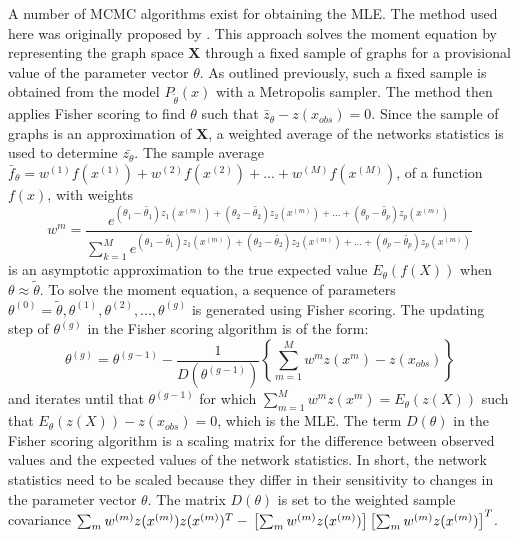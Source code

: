 \documentclass[a4paper, man]{apa6}
\begin{document}
A number of MCMC algorithms exist for obtaining the MLE. The method used here was originally proposed by . \clearpage \noindent This approach solves the moment equation by representing the graph space $\textbf{X}$ through a fixed sample of graphs for a provisional value of the parameter vector $\theta$. As outlined previously, such a fixed sample is obtained from the model $P_{\tilde{\theta}}(x)$ with a Metropolis sampler. The method then applies Fisher scoring to find $\theta$ such that $\bar{z}_\theta − z(x_{obs}) = 0$. Since the sample of graphs is an approximation of $\textbf{X}$, a weighted average of the networks statistics is used to determine $\bar{z_{\theta}}$. The sample average $\bar{f}_{\theta} = w^{(1)}f(x^{(1)}) + w^{(2)}f(x^{(2)}) + ... + w^{(M)}f(x^{(M)})$, of a function $f(x)$, with weights \begin{equation} w^{m} = \frac{e^{(\theta_{1} - \tilde{\theta_{1}})z_{1}(x^{(m)}) + (\theta_{2} - \tilde{\theta_{2}})z_{2}(x^{(m)}) + ... + (\theta_{p} - \tilde{\theta_{p}})z_{p}(x^{(m)})}}{\sum_{k=1}^{M}e^{(\theta_{1} - \tilde{\theta_{1}})z_{1}(x^{(m)}) + (\theta_{2} - \tilde{\theta_{2}})z_{2}(x^{(m)}) + ... + (\theta_{p} - \tilde{\theta_{p}})z_{p}(x^{(m)})}} \end{equation} is an asymptotic approximation to the true expected value $E_{\theta}(f(X))$ when $\theta \approx \tilde{\theta}$. To solve the moment equation, a sequence of parameters $\theta^{(0)} = \tilde{\theta}, \theta^{(1)}, \theta^{(2)}, ..., \theta^{(g)}$ is generated using Fisher scoring. The updating step of $\theta^{(g)}$ in the Fisher scoring algorithm is of the form: \begin{equation} \theta^{(g)} = \theta^{(g-1)} - \frac{1}{D(\theta^{(g-1)})} \left\{\sum_{m=1}^{M}w^{m}z(x^{m}) - z(x_{obs}) \right\} \end{equation} and iterates until that $\theta^{(g-1)}$ for which $\sum_{m=1}^{M}w^{m}z(x^{m}) = E_{\theta}(z(X))$ such that $E_{\theta}(z(X)) - z(x_{obs}) = 0$, which is the MLE. The term $D(\theta)$ in the Fisher scoring algorithm is a scaling matrix for the difference between observed values and the expected values of the network statistics. In short, the network statistics need to be scaled because they differ in their sensitivity to changes in the parameter vector $\theta$. The matrix $D(\theta)$ is set to the weighted sample covariance $\sum_{m}w^{(m)}z(x^{(m)})z(x^{(m)})^{T} - \\ \noindent \left[ \sum_{m}w^{(m)}z(x^{(m)}) \right] \left[ \sum_{m}w^{(m)}z(x^{(m)}) \right]^{T}$. 
\\
\end{document}
